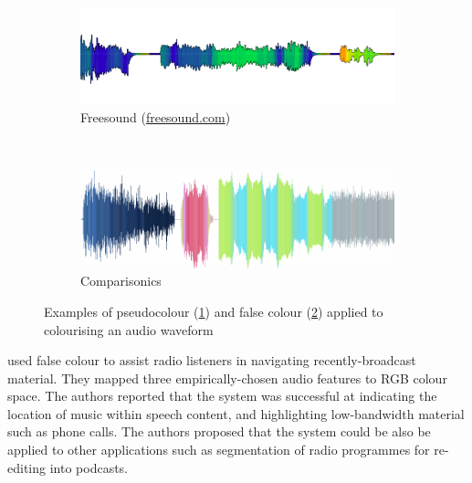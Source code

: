\begin{figure}[p]
\centering
\begin{subfigure}{\textwidth}
  \centering
  \includegraphics[width=\linewidth]{figs/freesound2.png}
  \caption{Freesound (\url{freesound.com})}
  \label{fig:freesound}
\end{subfigure}\\%
\begin{subfigure}{\textwidth}
  \centering
  \includegraphics[width=\linewidth]{figs/rice.png}
  \caption{Comparisonics \citep{Rice2005}}
  \label{fig:rice}
\end{subfigure}
\caption{Examples of pseudocolour (\ref{fig:freesound}) and false colour
  (\ref{fig:rice}) applied to colourising an audio waveform}
\label{fig:colourvis}
\end{figure}

\citet{Mason2007} used false colour to assist radio listeners in navigating recently-broadcast material. They mapped
three empirically-chosen audio features to RGB colour space. The authors reported that the system was successful at
indicating the location of music within speech content, and highlighting low-bandwidth material such as phone calls.
The authors proposed that the system could be also be applied to other applications such as segmentation of radio
programmes for re-editing into podcasts.


